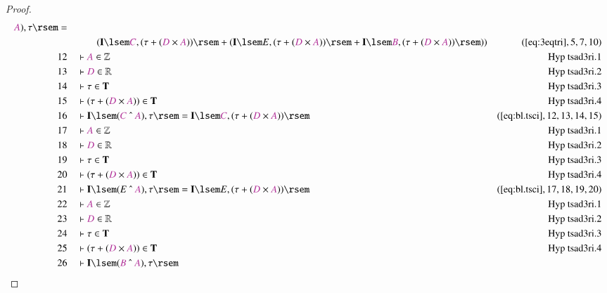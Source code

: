 \begin{proof}
\begin{align}
      \mc{A} ) , \tau \rsem =  \notag \\ & & & \qquad
     ( \mathbf{I} \lsem \mc{C} , (
      \tau + ( \mc{D} \times \mc{A} ) ) \rsem + ( \mathbf{I}
      \lsem E , ( \tau + ( \mc{D} \times \mc{A} ) ) \rsem +
      \mathbf{I} \lsem \mc{B} , ( \tau + ( \mc{D} \times
      \mc{A} ) ) \rsem )
      )&(\mbox{\ref{eq:3eqtri}},5,7,10)\notag
  \\ 12 &&  & \vdash \mc{A} \in
      \mathbb{Z}&\text{Hyp~tsad3ri.1}\notag%
  \\ 13 &&  & \vdash \mc{D} \in
      \mathbb{R}&\text{Hyp~tsad3ri.2}\notag%
  \\ 14 &&  & \vdash \tau \in
      \mathbf{T}&\text{Hyp~tsad3ri.3}\notag%
  \\ 15 &&  & \vdash ( \tau + ( \mc{D} \times \mc{A} ) ) \in
      \mathbf{T}&\text{Hyp~tsad3ri.4}\notag%
  \\ 16 &&  & \vdash \mathbf{I} \lsem ( \mc{C} ~\string^~ \mc{A} ) , \tau \rsem
      = \mathbf{I} \lsem \mc{C} , ( \tau + ( \mc{D} \times
      \mc{A} ) )
      \rsem&(\mbox{\ref{eq:bl.tsci}},12,13,14,15)\notag
  \\ 17 &&  & \vdash \mc{A} \in
      \mathbb{Z}&\text{Hyp~tsad3ri.1}\notag%
  \\ 18 &&  & \vdash \mc{D} \in
      \mathbb{R}&\text{Hyp~tsad3ri.2}\notag%
  \\ 19 &&  & \vdash \tau \in
      \mathbf{T}&\text{Hyp~tsad3ri.3}\notag%
  \\ 20 &&  & \vdash ( \tau + ( \mc{D} \times \mc{A} ) ) \in
      \mathbf{T}&\text{Hyp~tsad3ri.4}\notag%
  \\ 21 &&  & \vdash \mathbf{I} \lsem ( E ~\string^~ \mc{A} ) , \tau \rsem =
      \mathbf{I} \lsem E , ( \tau + ( \mc{D} \times \mc{A} )
      ) \rsem&(\mbox{\ref{eq:bl.tsci}},17,18,19,20)\notag
  \\ 22 &&  & \vdash \mc{A} \in
      \mathbb{Z}&\text{Hyp~tsad3ri.1}\notag%
  \\ 23 &&  & \vdash \mc{D} \in
      \mathbb{R}&\text{Hyp~tsad3ri.2}\notag%
  \\ 24 &&  & \vdash \tau \in
      \mathbf{T}&\text{Hyp~tsad3ri.3}\notag%
  \\ 25 &&  & \vdash ( \tau + ( \mc{D} \times \mc{A} ) ) \in
      \mathbf{T}&\text{Hyp~tsad3ri.4}\notag%
  \\ 26 &&  & \vdash \mathbf{I} \lsem ( \mc{B} ~\string^~ \mc{A} ) , \tau \rsem

\end{align}
\end{proof}

